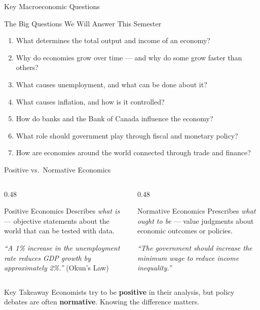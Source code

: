 \documentclass[aspectratio=169]{beamer}
\begin{document}
\begin{frame}{Key Macroeconomic Questions}
\transfade
\begin{block}{The Big Questions We Will Answer This Semester}
  \begin{enumerate}
    \item What determines the total output and income of an economy?
    \item Why do economies grow over time --- and why do some grow faster than others?
    \item What causes unemployment, and what can be done about it?
    \item What causes inflation, and how is it controlled?
    \item How do banks and the Bank of Canada influence the economy?
    \item What role should government play through fiscal and monetary policy?
    \item How are economies around the world connected through trade and finance?
  \end{enumerate}
\end{block}
\end{frame}

\begin{frame}{Positive vs.\ Normative Economics}

\begin{columns}
  \begin{column}{0.48\textwidth}
    \begin{block}{Positive Economics}
      Describes \textit{what is} --- objective statements about the world that can be tested with data.
      \vspace{0.3em}

      \textit{``A 1\% increase in the unemployment rate reduces GDP growth by approximately 2\%.''} (Okun's Law)
    \end{block}
  \end{column}
  \begin{column}{0.48\textwidth}
    \begin{block}{Normative Economics}
      Prescribes \textit{what ought to be} --- value judgments about economic outcomes or policies.
      \vspace{0.3em}

      \textit{``The government should increase the minimum wage to reduce income inequality.''}
    \end{block}
  \end{column}
\end{columns}
\vspace{0.5em}
\begin{alertblock}{Key Takeaway}
  Economists try to be \textbf{positive} in their analysis, but policy debates are often \textbf{normative}. Knowing the difference matters.
\end{alertblock}
\end{frame}
\end{document}
